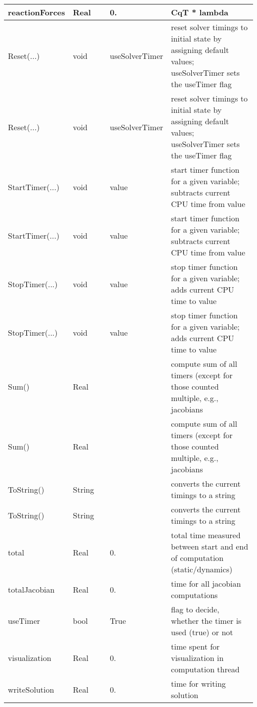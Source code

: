 \begin{center}
\begin{longtable}{| p{4.2cm} | p{2.5cm} | p{0.3cm} | p{3.0cm} | p{6cm} |}
    reactionForces &     Real &      &     0. &     CqT * lambda\\ \hline
    Reset(...) &     void &      &     useSolverTimer &     reset solver timings to initial state by assigning default values; useSolverTimer sets the useTimer flag\\ \hline
    Reset(...) &     void &      &     useSolverTimer &     reset solver timings to initial state by assigning default values; useSolverTimer sets the useTimer flag\\ \hline
    StartTimer(...) &     void &      &     value &     start timer function for a given variable; subtracts current CPU time from value\\ \hline
    StartTimer(...) &     void &      &     value &     start timer function for a given variable; subtracts current CPU time from value\\ \hline
    StopTimer(...) &     void &      &     value &     stop timer function for a given variable; adds current CPU time to value\\ \hline
    StopTimer(...) &     void &      &     value &     stop timer function for a given variable; adds current CPU time to value\\ \hline
    Sum() &     Real &      &      &     compute sum of all timers (except for those counted multiple, e.g., jacobians\\ \hline
    Sum() &     Real &      &      &     compute sum of all timers (except for those counted multiple, e.g., jacobians\\ \hline
    ToString() &     String &      &      &     converts the current timings to a string\\ \hline
    ToString() &     String &      &      &     converts the current timings to a string\\ \hline
    total &     Real &      &     0. &     total time measured between start and end of computation (static/dynamics)\\ \hline
    totalJacobian &     Real &      &     0. &     time for all jacobian computations\\ \hline
    useTimer &     bool &      &     True &     flag to decide, whether the timer is used (true) or not\\ \hline
    visualization &     Real &      &     0. &     time spent for visualization in computation thread\\ \hline
    writeSolution &     Real &      &     0. &     time for writing solution\\ \hline
	  \end{longtable}
	\end{center}


